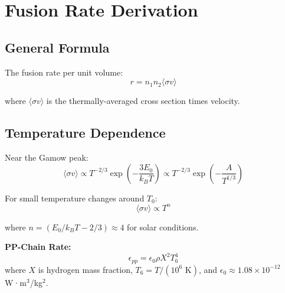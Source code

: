 \documentclass[12pt,a4paper]{article}
\newcommand{\kB}{k_B}
\begin{document}

\section{Fusion Rate Derivation}

\subsection{General Formula}

The fusion rate per unit volume:
\begin{equation}
r = n_1 n_2 \langle\sigma v\rangle
\end{equation}

where $\langle\sigma v\rangle$ is the thermally-averaged cross section times velocity.

\subsection{Temperature Dependence}

Near the Gamow peak:
\begin{equation}
\langle\sigma v\rangle \propto T^{-2/3} \exp\left(-\frac{3E_0}{\kB T}\right) \propto T^{-2/3} \exp\left(-\frac{A}{T^{1/3}}\right)
\end{equation}

For small temperature changes around $T_0$:
\begin{equation}
\langle\sigma v\rangle \propto T^n
\end{equation}

where $n = (E_0/\kB T - 2/3) \approx 4$ for solar conditions.

\begin{keyresult}
\textbf{PP-Chain Rate:}
\begin{equation}
\boxed{\epsilon_{pp} = \epsilon_0 \rho X^2 T_6^4}
\end{equation}
where $X$ is hydrogen mass fraction, $T_6 = T/(10^6 \text{ K})$, and $\epsilon_0 \approx 1.08 \times 10^{-12}$ W·m$^3$/kg$^2$.
\end{keyresult}

\end{document}
